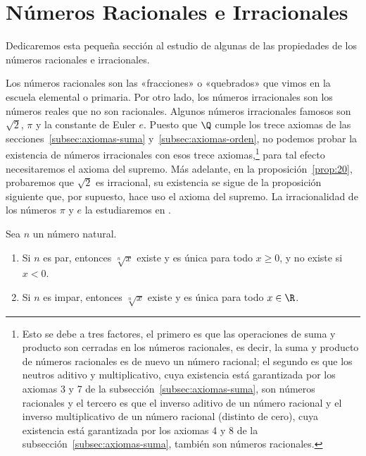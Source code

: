 \documentclass[12pt,a4paper]{book}
\begin{document}
    \section{Números Racionales e Irracionales}\label{sec:racionales}

    Dedicaremos esta pequeña sección al estudio de algunas de las propiedades
    de los números racionales e irracionales.

    Los números racionales son las «fracciones» o «quebrados» que vimos en
    la escuela elemental o primaria. Por otro lado, los números irracionales son
    los números reales que no son racionales. Algunos números irracionales famosos
    son $\sqrt{2}$, $\pi$ y la constante de Euler $e$. Puesto que $\Q$ cumple los trece
    axiomas de las secciones~\ref{subsec:axiomas-suma} y~\ref{subsec:axiomas-orden}, no podemos probar la existencia de
    números irracionales con esos trece axiomas,\footnote{Esto se debe a tres factores, el primero es que las operaciones de suma y producto son
    cerradas en los números racionales, es decir, la suma y producto de números racionales es
    de nuevo un número racional; el segundo es que los neutros aditivo y multiplicativo, cuya
    existencia está garantizada por los axiomas 3 y 7 de la subsección~\ref{subsec:axiomas-suma}, son números racionales
    y el tercero es que el inverso aditivo de un número racional y el inverso multiplicativo
    de un número racional (distinto de cero), cuya existencia está garantizada por los axiomas
    4 y 8 de la subsección~\ref{subsec:axiomas-suma}, también son números racionales.} para tal efecto necesitaremos
    el axioma del supremo. Más adelante, en la proposición~\ref{prop:20}, probaremos que
    $\sqrt{2}$ es irracional, su existencia se sigue de la proposición siguiente que, por
    supuesto, hace uso el axioma del supremo. La irracionalidad de los números
    $\pi$ y $e$ la estudiaremos en \cite{nunez2020calculoII}.

    \begin{proposicion}\label{prop:19}
        Sea $n$ un número natural.
        \begin{enumerate}[nosep]
            \item Si $n$ es par, entonces $\sqrt[n]{x}$ existe y es única para todo $x\geq 0$, y no existe si
            $x<0$.
            \item Si $n$ es impar, entonces $\sqrt[n]{x}$ existe y es única para todo $x\in\R$.
        \end{enumerate}
    \end{proposicion}
\end{document}
